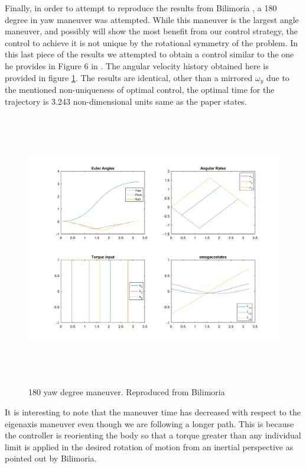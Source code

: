 Finally, in order to attempt to reproduce the results from Bilimoria \cite{bilimoria1993time}, a 180 degree in yaw maneuver was attempted. While this maneuver is the largest angle maneuver, and possibly will show the most benefit from our control strategy, the control to achieve it is not unique by the rotational symmetry of the problem. In this last piece of the results we attempted to obtain a control similar to the one he provides in Figure 6 in \cite{bilimoria1993time}. The angular velocity history obtained here is provided in figure \ref{fig:bilimoriaResults}. The results are identical, other than a mirrored $\omega_y$ due to the mentioned non-uniqueness of optimal control, the optimal time for the trajectory is 3.243 non-dimensional units same as the paper states.

\begin{figure}[H]
	\centering
	\includegraphics[height=12cm,keepaspectratio]{media/BilimorialInftyManeuver.png}
	\caption{180 yaw degree maneuver. Reproduced from Bilimoria\cite{bilimoria1993time}}
	\label{fig:bilimoriaResults}
\end{figure}

It is interesting to note that the maneuver time has decreased with respect to the eigenaxis maneuver even though we are following a longer path. This is because the controller is reorienting the body so that a torque greater than any individual limit is applied in the desired rotation of motion from an inertial perspective as pointed out by Bilimoria\cite{bilimoria1993time}.

